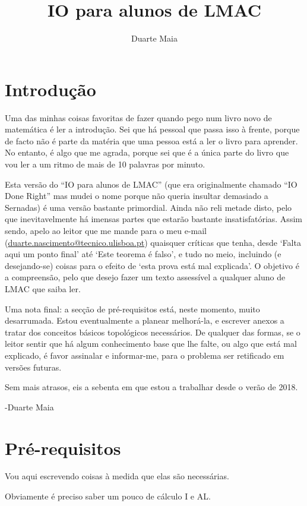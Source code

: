 \documentclass{article}
\title{IO para alunos de LMAC}
\author{Duarte Maia \\ \myemailref}
\date{}
\makeatletter
\newcommand{\myemail}{duarte.nascimento@tecnico.ulisboa.pt}
\newcommand{\myemailref}{\href{mailto:\myemail}{\myemail}}
\theoremstyle{definition}
\makeatother
\begin{document}
	\maketitle
	
	\tableofcontents
	
	\section{Introdução}
	
	Uma das minhas coisas favoritas de fazer quando pego num livro novo de matemática é ler a introdução. Sei que há pessoal que passa isso à frente, porque de facto não é parte da matéria que uma pessoa está a ler o livro para aprender. No entanto, é algo que me agrada, porque sei que é a única parte do livro que vou ler a um ritmo de mais de 10 palavras por minuto.
	
	Esta versão do ``IO para alunos de LMAC'' (que era originalmente chamado ``IO Done Right'' mas mudei o nome porque não queria insultar demasiado a Sernadas) é uma versão bastante primordial. Ainda não reli metade disto, pelo que inevitavelmente há imensas partes que estarão bastante insatisfatórias. Assim sendo, apelo ao leitor que me mande para o meu e-mail (\myemailref) quaisquer críticas que tenha, desde `Falta aqui um ponto final' até `Este teorema é falso', e tudo no meio, incluindo (e desejando-se) coisas para o efeito de `esta prova está mal explicada'. O objetivo é a compreensão, pelo que desejo fazer um texto assessível a qualquer aluno de LMAC que saiba ler.
	
	Uma nota final: a secção de pré-requisitos está, neste momento, muito desarrumada. Estou eventualmente a planear melhorá-la, e escrever anexos a tratar dos conceitos básicos topológicos necessários. De qualquer das formas, se o leitor sentir que há algum conhecimento base que lhe falte, ou algo que está mal explicado, é favor assinalar e informar-me, para o problema ser retificado em versões futuras.
	
	Sem mais atrasos, eis a sebenta em que estou a trabalhar desde o verão de 2018.
	
	-Duarte Maia
	
	\section{Pré-requisitos}
	
	Vou aqui escrevendo coisas à medida que elas são necessárias.
	
	Obviamente é preciso saber um pouco de cálculo I e AL.
	
\end{document}
